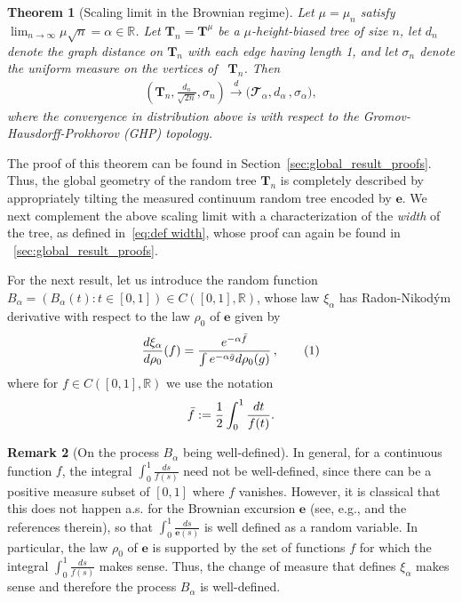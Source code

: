 \documentclass{article}
\newcommand{\ccT}{\mathbfcal{T}}
\newcommand{\1}{\mathbbm{1}}								%
\newcommand\numberthis{\addtocounter{equation}{1}\tag{\theequation}}
\newtheorem{theorem}{Theorem}[section]
\theoremstyle{definition}
\newtheorem{remark}[theorem]{Remark}
\numberwithin{equation}{section}
\newcommand{\bT}{\mathbf T}
\newcommand{\R}{\mathbb R}
\newcommand{\toindis}{\overset d\longrightarrow}
\begin{document}
\begin{theorem}[Scaling limit in the Brownian regime]\label{thm:scaling limit}
    Let $\mu=\mu_n$ satisfy $\lim_{n\rightarrow\infty}\mu\sqrt{n}=\alpha\in\R$.
    Let $\mathbf{T}_n=\bT^\mu$ be a $\mu$-height-biased tree of size $n$, let $d_n$ denote the graph distance on $\mathbf{T}_n$ with each edge having length 1, and let $\sigma_n$ denote the uniform measure on the  vertices of ~$\bT_n$. Then
    \begin{align*}
        \left(\mathbf{T}_n,\frac{d_n}{\sqrt{2n}}, {\sigma_n}\right) \toindis \big(\ccT_{\alpha},d_{\alpha}\,, \sigma_{\alpha}\big),
    \end{align*}
    where the convergence in distribution above is with respect to the Gromov-Hausdorff-Prokhorov (GHP) topology.
\end{theorem}

The proof of this theorem can be found in Section~\ref{sec:global_result_proofs}.
Thus, the global geometry of the random tree $\mathbf{T}_n$ is completely described by appropriately tilting
{the measured continuum random tree encoded by $\mathbf{e}$}. We next complement the above scaling limit with a characterization of the \emph{width} of the tree, as defined in~\eqref{eq:def width}, {whose proof can again be found in} ~\cref{sec:global_result_proofs}.

{For the next result, let us introduce the random function $B_\alpha=(B_\alpha(t):t \in [0,1]) \in C([0,1],\R)$, whose law $\xi_\alpha$ has Radon-Nikodým derivative with respect to {the law $\rho_0$ of}  $\mathbf{e}$ given by
\begin{align*}
\frac{d \xi_{\alpha}}{d\rho_0}(f)=\frac{e^{-\alpha \Bar{f}}}{\int e^{-\alpha \Bar{g}} d\rho_0(g)}\, , \numberthis \label{eq:law_balpha_xialpha}
        \end{align*}
where for $f\in C([0,1],\R)$ we use the notation 
\begin{align*}
    \Bar{f}:=\frac{1}{2}\int_{0}^1 \frac{dt}{f(t)}.
\end{align*}
}

\begin{remark}[On the process $B_\alpha$ being well-defined]
    In general, for a continuous function $f$, the integral $\int_0^1\frac{ds}{f(s)}$ need not  be well-defined, since there can be a positive measure subset of $[0,1]$ where $f$ vanishes. However, it is classical that this does not happen a.s. for the Brownian excursion $\mathbf{e}$ (see, e.g., \cite{chassaing2000height} and the references therein), so that $\int_0^1\frac{ds}{\mathbf{e}(s)}$ is well defined as a random variable. In particular, the law $\rho_0$ of $\mathbf{e}$ is supported by the set of functions $f$ for which the integral $\int_0^1\frac{ds}{f(s)}$ makes sense. Thus, the change of measure that defines $\xi_\alpha$ makes sense and therefore the process $B_\alpha$ is well-defined.
\end{remark}
\end{document}
